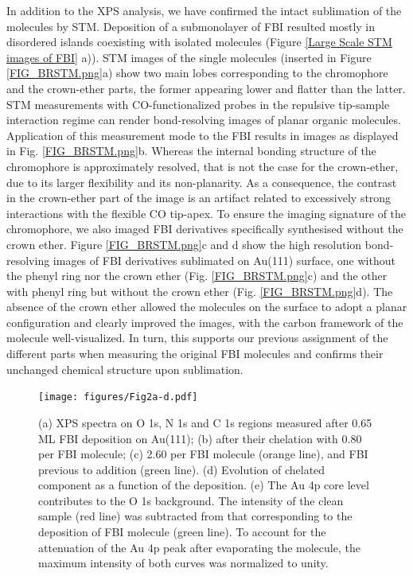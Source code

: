 \documentclass[aps,prl,reprint,longbibliography,superscriptaddress, english]{revtex4-1}
\begin{document}
In addition to the XPS analysis, we have confirmed the intact sublimation of the molecules by STM. Deposition of a submonolayer of FBI resulted mostly in disordered islands coexisting with isolated molecules (Figure \ref{Large Scale STM images of FBI} a)). STM images of the single molecules (inserted in Figure  \ref{FIG_BRSTM.png}a) show two main lobes corresponding to the chromophore and the crown-ether parts, the former appearing lower and flatter than the latter. STM measurements with CO-functionalized probes in the repulsive tip-sample interaction regime can render bond-resolving images of planar organic molecules.\cite{gross_recent_2011,gross_atomic_2018} Application of this measurement mode to the FBI results in images as displayed in Fig. \ref{FIG_BRSTM.png}b. Whereas the internal bonding structure of the chromophore is approximately resolved, that is not the case for the crown-ether, due to its larger flexibility and its non-planarity. As a consequence, the contrast in the crown-ether part of the image is an artifact related to excessively strong interactions with the flexible CO tip-apex.\cite{moll_mechanisms_2010,hapala_mechanism_2014} To ensure the imaging signature of the chromophore, we also imaged FBI derivatives specifically synthesised without the crown ether. Figure  \ref{FIG_BRSTM.png}c and d show the high resolution bond-resolving images of FBI derivatives sublimated on Au(111) surface, one without the phenyl ring nor the crown ether (Fig. \ref{FIG_BRSTM.png}c)  and the other with phenyl ring but without the crown ether (Fig. \ref{FIG_BRSTM.png}d). The absence of the crown ether allowed the molecules on the surface to adopt a planar configuration and clearly improved the images, with the carbon framework of the molecule well-visualized. In turn, this supports our previous assignment of the different parts when measuring the original FBI molecules and confirms their unchanged chemical structure upon sublimation.  


\begin{figure}[ht!]
	\texttt{[image: figures/Fig2a-d.pdf]}
	
	\caption{\label{XPS_FBI_Au(111)} 
    (a) XPS spectra on O 1s, N 1s and C 1s regions measured after 0.65 ML FBI deposition on Au(111); (b) after their chelation with 0.80 \Bapp per FBI molecule; (c) 2.60 \Nap per FBI molecule (orange line), and FBI previous to \Nap addition (green line). (d) Evolution of chelated component as a function of the \Bapp deposition. (e) The Au 4p core level contributes to the O 1s background. The intensity of the clean sample (red line) was subtracted from that corresponding to the deposition of FBI molecule (green line). To account for the attenuation of the Au 4p peak after evaporating the molecule, the maximum intensity of both curves was normalized to unity.}
\end{figure}  
\end{document}
